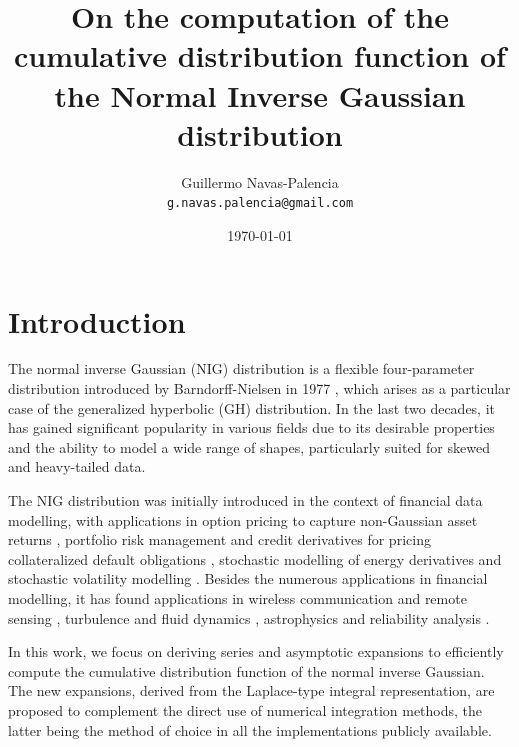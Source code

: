 \documentclass[10pt,a4paper,oneside]{article}
\title{On the computation of the cumulative distribution function of the Normal Inverse Gaussian distribution}
\author{
 \normalsize  Guillermo Navas-Palencia\\
  \texttt{\normalsize  g.navas.palencia@gmail.com}
}
\date{\small \today}
\numberwithin{equation}{section}
\begin{document}
\maketitle



\section{Introduction}\label{sec1}

The normal inverse Gaussian (NIG) distribution is a flexible four-parameter distribution introduced by Barndorff-Nielsen in 1977 \cite{Barndorff1977}, which arises as a particular case of the generalized hyperbolic (GH) distribution. In the last two decades, it has gained significant popularity in various fields due to its desirable properties and the ability to model a wide range of shapes,  particularly suited for skewed and heavy-tailed data. 

The NIG distribution was initially introduced in the context of financial data modelling, with applications in option pricing to capture non-Gaussian asset returns \cite{Eriksson2009}, portfolio risk management and credit derivatives for pricing collateralized default obligations \cite{Prause1999, Kalemanova2007, Navas-Palencia_thesis2016}, stochastic modelling of energy derivatives \cite{Benth2004} and stochastic volatility modelling \cite{Barndorff1997}. Besides the numerous applications in financial modelling, it has found applications in wireless communication and remote sensing \cite{Hanssen2001, Solbo2004}, turbulence and fluid dynamics \cite{Hedevang2013}, astrophysics \cite{Louarn2024} and reliability analysis \cite{Xu2022}.


In this work, we focus on deriving series and asymptotic expansions to efficiently compute the cumulative distribution function of the normal inverse Gaussian. The new expansions, derived from the Laplace-type integral representation, are proposed to complement the direct use of numerical integration methods, the latter being the method of choice in all the implementations publicly available. 
\end{document}
